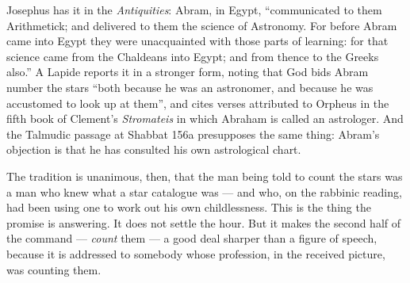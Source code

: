 Josephus has it in the \textit{Antiquities}: Abram, in Egypt, ``communicated to
them Arithmetick; and delivered to them the science of Astronomy. For before
Abram came into Egypt they were unacquainted with those parts of learning: for
that science came from the Chaldeans into Egypt; and from thence to the Greeks
also.'' A Lapide reports it in a stronger form, noting that God bids Abram
number the stars ``both because he was an astronomer, and because he was
accustomed to look up at them'', and cites verses attributed to Orpheus in the
fifth book of Clement's \textit{Stromateis} in which Abraham is called an
astrologer. And the Talmudic passage at
Shabbat 156a presupposes the same thing: Abram's objection is that he has
consulted his own astrological chart.

The tradition is unanimous, then, that the man being told to count the stars was
a man who knew what a star catalogue was --- and who, on the rabbinic reading,
had been using one to work out his own childlessness. This is the thing the
promise is answering. It does not settle the hour. But it makes the second half
of the command --- \textit{count} them --- a good deal sharper than a figure of
speech, because it is addressed to somebody whose profession, in the received
picture, was counting them.
